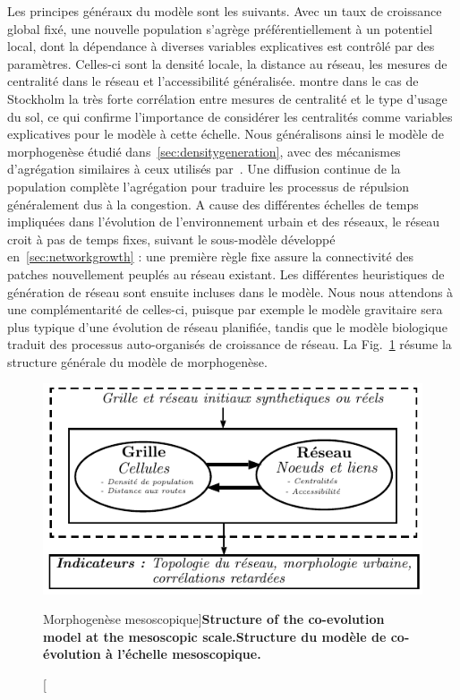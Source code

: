 {Les principes généraux du modèle sont les suivants. Avec un taux de croissance global fixé, une nouvelle population s'agrège préférentiellement à un potentiel local, dont la dépendance à diverses variables explicatives est contrôlé par des paramètres. Celles-ci sont la densité locale, la distance au réseau, les mesures de centralité dans le réseau et l'accessibilité généralisée. \cite{doi:10.1080/13658816.2014.893347} montre dans le cas de Stockholm la très forte corrélation entre mesures de centralité et le type d'usage du sol, ce qui confirme l'importance de considérer les centralités comme variables explicatives pour le modèle à cette échelle. Nous généralisons ainsi le modèle de morphogenèse étudié dans~\ref{sec:densitygeneration}, avec des mécanismes d'agrégation similaires à ceux utilisés par~\cite{raimbault2014hybrid}. Une diffusion continue de la population complète l'agrégation pour traduire les processus de répulsion généralement dus à la congestion. A cause des différentes échelles de temps impliquées dans l'évolution de l'environnement urbain et des réseaux, le réseau croit à pas de temps fixes, suivant le sous-modèle développé en~\ref{sec:networkgrowth} : une première règle fixe assure la connectivité des patches nouvellement peuplés au réseau existant. Les différentes heuristiques de génération de réseau sont ensuite incluses dans le modèle. Nous nous attendons à une complémentarité de celles-ci, puisque par exemple le modèle gravitaire sera plus typique d'une évolution de réseau planifiée, tandis que le modèle biologique traduit des processus auto-organisés de croissance de réseau. La Fig.~\ref{fig:mesocoevolmodel:workflow} résume la structure générale du modèle de morphogenèse.
}




\begin{figure}
	\includegraphics[width=\linewidth]{Figures/MesoCoEvol/mesocoevol_fr.pdf}
	\caption[Morphogenesis at the mesoscopic scale][Morphogenèse mesoscopique]{\textbf{Structure of the co-evolution model at the mesoscopic scale.}\label{fig:mesocoevolmodel:workflow}}{\textbf{Structure du modèle de co-évolution à l'échelle mesoscopique.}\label{fig:mesocoevolmodel:workflow}}
\end{figure}




